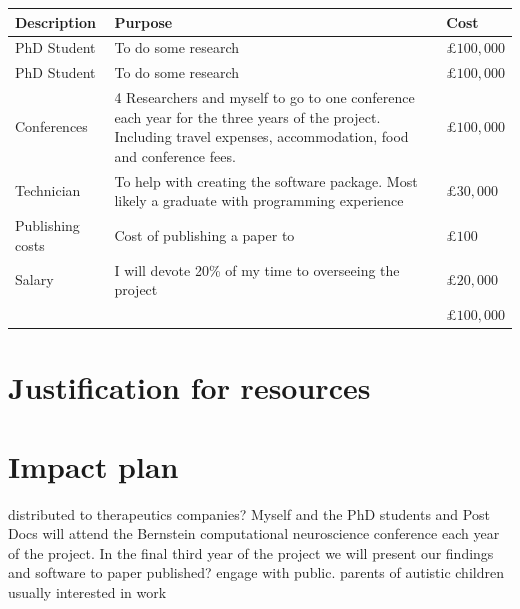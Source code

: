 \documentclass{epsrc}
\begin{document}
\begin{center}
\begin{tabular}{ p{3cm} p{7cm} p{3cm} }
 \hline
 Description & Purpose & Cost\\
 \hline
 PhD Student   & To do some research  &  $\pounds 100,000$\\[5pt]
 PhD Student   & To do some research  &  $\pounds 100,000$\\[5pt]
 Conferences  & 4 Researchers and myself to go to one conference each year for the three years of the project. Including travel expenses, accommodation, food and conference fees.  &  $\pounds 100,000$\\[5pt]
 Technician   & To help with creating the software package. Most likely a graduate with programming experience   &  $\pounds 30,000$\\[5pt]
 Publishing costs   & Cost of publishing a paper to   &  $\pounds 100$\\[5pt]
 Salary   & I will devote 20\% of my time to overseeing the project   &  $\pounds 20,000$\\[5pt]
\cline{3-3}
 & & $\pounds 100,000$ \\
\end{tabular}
\end{center}

\part{Justification for resources}

\part{Impact plan}
distributed to therapeutics companies?
Myself and the PhD students and Post Docs will attend the Bernstein computational neuroscience conference each year of the project. In the final third year of the project we will present our findings and software to 
paper published?
engage with public. parents of autistic children usually interested in work
\end{document}
